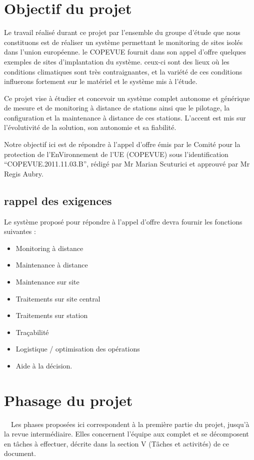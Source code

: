 \documentclass{mise_en_page}
\begin{document}
\section{Objectif du projet}
Le travail réalisé durant ce projet par l’ensemble du groupe d’étude que
nous constituons est de réaliser un système permettant le monitoring de
sites isolés dans l’union européenne. le COPEVUE fournit dans son appel
d’offre quelques exemples de sites d’implantation du système. ceux-ci
sont des lieux où les conditions climatiques sont très contraignantes,
et la variété de ces conditions influerons fortement sur le matériel et
le système mis à l’étude.

Ce projet vise à étudier et concevoir un système complet autonome et
générique de mesure et de monitoring à distance de stations ainsi que
le pilotage, la configuration et la maintenance à distance de ces
stations. L’accent est mis sur l’évolutivité de la solution, son
autonomie et sa fiabilité.

Notre objectif ici est de répondre à l’appel d’offre émis par le Comité
pour la protection de l’EnVironnement de l’UE (COPEVUE) sous
l’identification “COPEVUE.2011.11.03.B”, rédigé par Mr Marian Scuturici
et approuvé par Mr Regis Aubry.

\subsection{rappel des exigences}
Le système proposé pour répondre à l’appel d’offre devra fournir les
fonctions suivantes : 

\begin{itemize}
\item Monitoring à distance
\item Maintenance à distance
\item Maintenance sur site
\item Traitements sur site central
\item Traitements sur station
\item Traçabilité
\item Logistique / optimisation des opérations
\item Aide à la décision.
\end{itemize}
\section{Phasage du projet}
\ \ Les phases proposées ici correspondent à la première partie du
projet, jusqu’à la revue intermédiaire. Elles concernent l’équipe aux
complet et se décomposent en tâches à effectuer, décrite dans la
section V (Tâches et activités) de ce document.
\end{document}
